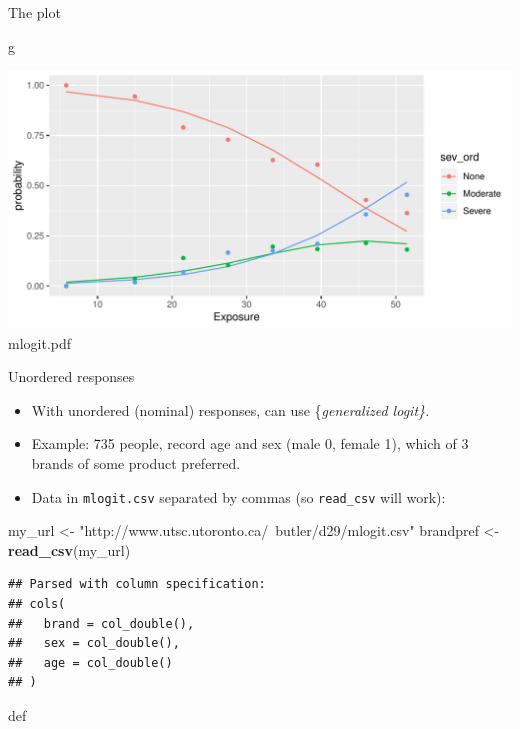 \documentclass[ignorenonframetext,]{beamer}
\newenvironment{Shaded}{\begin{snugshade}}{\end{snugshade}}
\newcommand{\KeywordTok}[1]{\textcolor[rgb]{0.13,0.29,0.53}{\textbf{#1}}}
\newcommand{\NormalTok}[1]{#1}
\newcommand{\StringTok}[1]{\textcolor[rgb]{0.31,0.60,0.02}{#1}}
\begin{document}
\begin{frame}[fragile]{The plot}
\protect\hypertarget{the-plot}{}

\begin{Shaded}
\begin{Highlighting}[]
\NormalTok{g}
\end{Highlighting}
\end{Shaded}

\includegraphics{figure/unnamed-chunk-98-1.pdf} mlogit.pdf

\end{frame}

\begin{frame}[fragile]{Unordered responses}
\protect\hypertarget{unordered-responses}{}

\begin{itemize}
\item
  With unordered (nominal) responses, can use \{\em generalized logit\}.
\item
  Example: 735 people, record age and sex (male 0, female 1), which of 3
  brands of some product preferred.
\item
  Data in \texttt{mlogit.csv} separated by commas (so \texttt{read\_csv}
  will work):
\end{itemize}

\begin{Shaded}
\begin{Highlighting}[]
\NormalTok{my_url <-}\StringTok{ "http://www.utsc.utoronto.ca/~butler/d29/mlogit.csv"}
\NormalTok{brandpref <-}\StringTok{ }\KeywordTok{read_csv}\NormalTok{(my_url)}
\end{Highlighting}
\end{Shaded}

\begin{verbatim}
## Parsed with column specification:
## cols(
##   brand = col_double(),
##   sex = col_double(),
##   age = col_double()
## )
\end{verbatim}

def

\end{frame}
\end{document}
